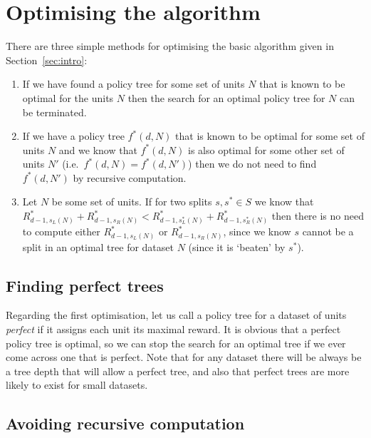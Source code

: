 \documentclass{article}
\begin{document}
\section{Optimising the algorithm}
\label{sec:optimising}

There are three simple methods for optimising the basic algorithm
given in Section~\ref{sec:intro}:
\begin{enumerate}
\item If we have found a policy tree for some set of units $N$
  that is known to be optimal for the units $N$ then the search for
  an optimal policy tree for $N$ can be terminated.
\item If we have a policy tree $f^{*}(d,N)$ that is known to be
  optimal for some set of units $N$ and we know that $f^{*}(d,N)$ is
  also optimal for some other set of units $N'$ (i.e.\  $f^{*}(d,N) =
  f^{*}(d,N')$) then we do not need to find $f^{*}(d,N')$ by recursive
  computation.
\item Let $N$ be some set of units. If for two splits $s, s^{*} \in S$ we
  know that
  $R^{*}_{d-1,s_{L}(N)} + R^{*}_{d-1,s_{R}(N)} < R^{*}_{d-1,s^{*}_{L}(N)}
  + R^{*}_{d-1,s^{*}_{R}(N)}$ then there is no need to compute either
  $R^{*}_{d-1,s_{L}(N)}$ or $R^{*}_{d-1,s_{R}(N)}$, since we know $s$
  cannot be a split in an optimal tree for dataset $N$ (since it is
  `beaten' by $s^{*}$).
\end{enumerate}

\subsection{Finding perfect trees}
\label{sec:perfect}

Regarding the first optimisation, let us call a policy tree for a
dataset of units \emph{perfect} if it assigns each unit its maximal
reward. It is obvious that a perfect policy tree is optimal, so we can
stop the search for an optimal tree if we ever come across one that is
perfect. Note that for any dataset there will be always be a tree
depth that will allow a perfect tree, and also that perfect trees are
more likely to exist for small datasets.

\subsection{Avoiding recursive computation}
\label{sec:avoiding}
\end{document}
